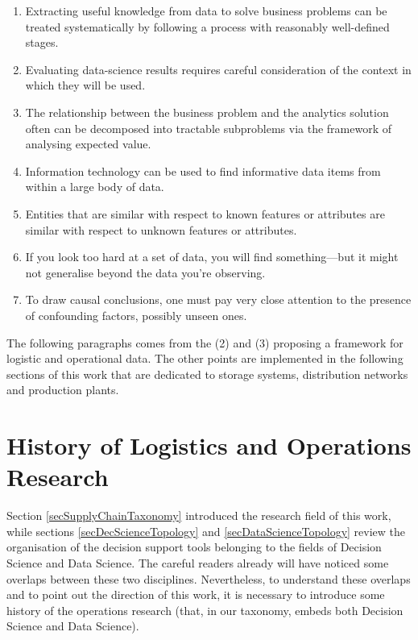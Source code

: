 \begin{enumerate}
    \item Extracting useful knowledge from data to solve business problems can be treated systematically by following a process with reasonably well-deﬁned stages.
    \item Evaluating data-science results requires careful consideration of the context in which they will be used.
    \item The relationship between the business problem and the analytics solution often can be decomposed into tractable subproblems via the framework of analysing expected value.
    \item Information technology can be used to ﬁnd informative data items from within a large body of data.
    \item Entities that are similar with respect to known features or attributes are similar with respect to unknown features or attributes.
    \item If you look too hard at a set of data, you will ﬁnd something—but it might not generalise beyond the data you’re observing.
   \item To draw causal conclusions, one must pay very close attention to the presence of confounding factors, possibly unseen ones.

\end{enumerate}

The following paragraphs comes from the (2) and (3) proposing a framework for logistic and operational data. The other points are implemented in the following sections of this work that are dedicated to storage systems, distribution networks and production plants.

\section{History of Logistics and Operations Research}
Section \ref{secSupplyChainTaxonomy} introduced the research field of this work, while sections \ref{secDecScienceTopology} and \ref{secDataScienceTopology} review the organisation of the decision support tools belonging to the fields of Decision Science and Data Science. The careful readers already will have noticed some overlaps between these two disciplines. Nevertheless, to understand these overlaps and to point out the direction of this work, it is necessary to introduce some history of the operations research (that, in our taxonomy, embeds both Decision Science and Data Science). \par

